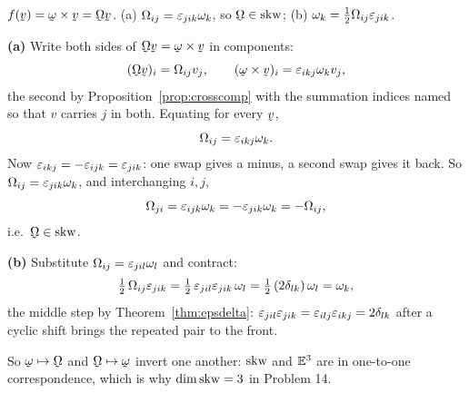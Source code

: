 \begin{problem}
$f(\bv)=\bom\times\bv=\bOm\bv$. (a) $\Omega_{ij}=\varepsilon_{jik}\omega_k$, so
$\bOm\in\Skw$; (b) $\omega_k=\tfrac12\Omega_{ij}\varepsilon_{jik}$.
\end{problem}
\begin{solution}
\textbf{(a)} Write both sides of $\bOm\bv=\bom\times\bv$ in components:
\[
   (\bOm\bv)_i=\Omega_{ij}v_j,
   \qquad
   (\bom\times\bv)_i=\eps_{ikj}\omega_kv_j ,
\]
the second by Proposition~\ref{prop:crosscomp} with the summation indices
named so that $v$ carries $j$ in both. Equating for every $\bv$,
\[
   \Omega_{ij}=\varepsilon_{ikj}\omega_k .
\]
Now $\varepsilon_{ikj}=-\varepsilon_{ijk}=\varepsilon_{jik}$: one swap gives a minus, a second
swap gives it back. So $\Omega_{ij}=\varepsilon_{jik}\omega_k$, and
interchanging $i,j$,
\[
   \Omega_{ji}=\varepsilon_{ijk}\omega_k=-\varepsilon_{jik}\omega_k=-\Omega_{ij},
\]
i.e.\ $\bOm\in\Skw$.

\textbf{(b)} Substitute $\Omega_{ij}=\varepsilon_{jil}\omega_l$ and contract:
\[
   \tfrac12\,\Omega_{ij}\varepsilon_{jik}
   =\tfrac12\,\varepsilon_{jil}\varepsilon_{jik}\,\omega_l
   =\tfrac12\,(2\delta_{lk})\,\omega_l=\omega_k ,
\]
the middle step by Theorem~\ref{thm:epsdelta}: $\varepsilon_{jil}\varepsilon_{jik}
=\varepsilon_{ilj}\varepsilon_{ikj}=2\delta_{lk}$ after a cyclic shift brings the repeated
pair to the front.

So $\bom\mapsto\bOm$ and $\bOm\mapsto\bom$ invert one another: $\operatorname{skw}$ and
$\mathbb{E}^{3}$ are in one-to-one correspondence, which is why
$\dim\operatorname{skw}=3$ in Problem 14.
\end{solution}

